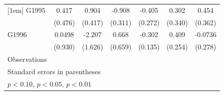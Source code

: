 \begin{table}[h!]
\begin{tabular}{l*{6}{c}}
[1em]
G1995               &       0.417         &       0.904\sym{**} &      -0.908\sym{***}&      -0.405         &       0.302         &       0.454         \\
                    &     (0.476)         &     (0.417)         &     (0.311)         &     (0.272)         &     (0.340)         &     (0.362)         \\
[1em]
G1996               &      0.0498         &      -2.207         &       0.668         &      -0.302\sym{**} &       0.409         &     -0.0736         \\
                    &     (0.930)         &     (1.626)         &     (0.659)         &     (0.135)         &     (0.254)         &     (0.278)         \\
\hline
Observations        &                     &                     &                     &                     &                     &                     \\
\hline\hline
\multicolumn{7}{l}{\footnotesize Standard errors in parentheses}\\
\multicolumn{7}{l}{\footnotesize \sym{*} \(p<0.10\), \sym{**} \(p<0.05\), \sym{***} \(p<0.01\)}\\
\end{tabular}
\end{table}

